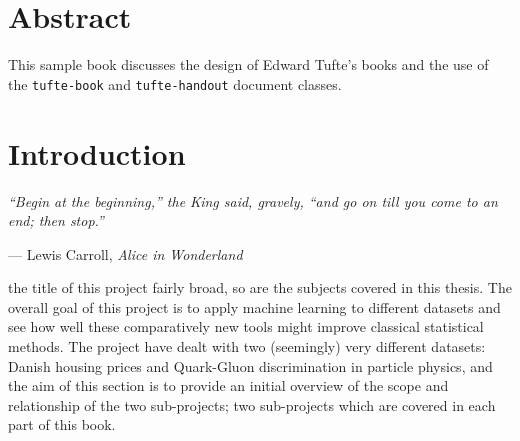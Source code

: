 \documentclass[a4paper, twoside]{tufte-book}
\newcommand{\doccls}[1]{\texttt{#1}}%
\begin{document}
\tableofcontents

\listoffigures

\listoftables



\cleardoublepage
\chapter{Abstract}

This sample book discusses the design of Edward Tufte's books
and the use of the \doccls{tufte-book} and \doccls{tufte-handout} document classes.


\mainmatter

\chapter{Introduction}
\label{ch:introduction}
\epigraph{\textit{``Begin at the beginning,'' the King said, gravely, ``and go on till you
come to an end; then stop.''}}{--- Lewis Carroll, \textit{Alice in Wonderland}}


 the title of this project fairly broad, so are the subjects covered in this thesis. The overall goal of this project is to apply machine learning to different datasets and see how well these comparatively new tools might improve classical statistical methods. The project have dealt with two (seemingly) very different datasets: Danish housing prices and Quark-Gluon discrimination in particle physics, and the aim of this section is to provide an initial overview of the scope and relationship of the two sub-projects; two sub-projects which are covered in each part of this book. 
\end{document}
